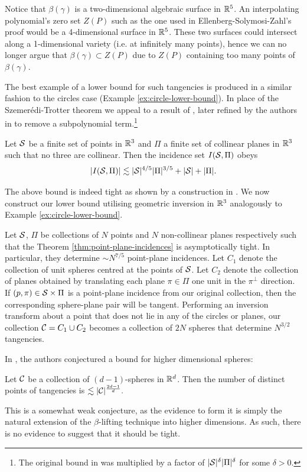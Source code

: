 Notice that $\beta(\gamma)$ is a two-dimensional algebraic surface in $\mathbb R^5$. An interpolating polynomial's zero set $Z(P)$ such as the one used in Ellenberg-Solymosi-Zahl's proof would be a 4-dimensional surface in $\mathbb R^5$.
These two surfaces could intersect along a 1-dimensional variety (i.e. at infinitely many points), hence we can no longer argue that $\beta(\gamma) \subset Z(P)$ due to $Z(P)$ containing too many points of $\beta(\gamma)$.

The best example of a lower bound for such tangencies is produced in a similar fashion to the circles case (Example \ref{ex:circle-lower-bound}). 
In place of the Szemerédi-Trotter theorem we appeal to a result of \cite{Guibas1990}, later refined by the authors in \cite{Sharir2007} to remove a subpolynomial term.\footnote{The original bound in \cite{Guibas1990} was multiplied by a factor of $|\mathcal S|^\delta|\Pi|^\delta$ for some $\delta>0$.}
\begin{theorem}
    Let $\mathcal S$ be a finite set of points in $\mathbb R^3$ and $\Pi$ a finite set of collinear planes in $\mathbb R^3$ such that no three are collinear. \label{thm:point-plane-incidences}
    Then the incidence set $I(\mathcal S, \Pi)$ obeys
    \[
        |I(\mathcal S, \Pi)| \lesssim |\mathcal S|^{4/5}|\Pi|^{3/5} + |\mathcal S| + |\Pi|.
    \] 
\end{theorem}
The above bound is indeed tight as shown by a construction in \cite{Knauer2003}.
We now construct our lower bound utilising geometric inversion in $\mathbb R^3$ analogously to Example \ref{ex:circle-lower-bound}.

\begin{example}
    Let $\mathcal S$, $\Pi$ be collections of $N$ points and $N$ non-collinear planes respectively such that the Theorem \ref{thm:point-plane-incidences} is asymptotically tight. 
    In particular, they determine $\sim N^{7/5}$ point-plane incidences. 
    Let $C_1$ denote the collection of unit spheres centred at the points of $\mathcal S$. 
    Let $C_2$ denote the collection of planes obtained by translating each plane $\pi \in \Pi$ one unit in the $\pi^{\perp}$ direction.
    If $(p,\pi) \in \mathcal S \times \Pi$ is a point-plane incidence from our original collection, then the corresponding sphere-plane pair will be tangent.
    Performing an inversion transform about a point that does not lie in any of the circles or planes, our collection $\mathcal C = C_1 \cup C_2$ becomes a 
    collection of $2N$ spheres that determine $N^{3/2}$ tangencies.
 \end{example}

 In \cite{ellenberg2016new}, the authors conjectured a bound for higher dimensional spheres:
 \begin{conjecture}
     Let $\mathcal C$ be a collection of $(d-1)$-spheres in $\mathbb R^d$. Then the number of distinct points of tangencies is $\lesssim |\mathcal C|^{\frac{2d-1}{d}}.$
 \end{conjecture}

This is a somewhat weak conjecture, as the evidence to form it is simply the natural extension of the $\beta$-lifting technique into higher dimensions. 
As such, there is no evidence to suggest that it should be tight. 

